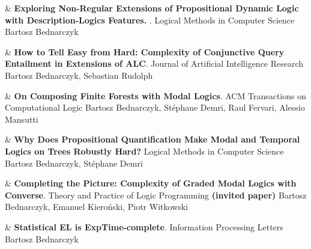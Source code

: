 \documentclass[10pt,a4paper]{article}
\begin{document}
\begin{EntriesTableYear}
    &
    \textbf{Exploring Non-Regular Extensions of Propositional Dynamic Logic with Description-Logics Features.
    }.
    \newline
    Logical Methods in Computer Science 
    \newline
    Bartosz Bednarczyk
    \\
  \end{EntriesTableYear}

\begin{EntriesTableYear}
  &
  \textbf{How to Tell Easy from Hard: Complexity of Conjunctive Query Entailment in Extensions of ALC}.
  \newline
  Journal of Artificial Intelligence Research 
  \newline
  Bartosz Bednarczyk, Sebastian Rudolph
  \\
\end{EntriesTableYear}

\begin{EntriesTableYear}
  &
  \textbf{On Composing Finite Forests with Modal Logics}.
  \newline
  ACM Transactions on Computational Logic
  \newline
  Bartosz Bednarczyk, Stéphane Demri, Raul Fervari, Alessio Mansutti
  \\
\end{EntriesTableYear}

\begin{EntriesTableYear}
  &
  \textbf{Why Does Propositional Quantification Make Modal and Temporal Logics on Trees Robustly Hard?}
  \newline
  Logical Methods in Computer Science
  \newline
 Bartosz Bednarczyk, Stéphane Demri
  \\
\end{EntriesTableYear}

\begin{EntriesTableYear}
  &
  \textbf{Completing the Picture: Complexity of Graded Modal Logics with Converse}.
  \newline
  Theory and Practice of Logic Programming \textbf{(invited paper)}
  \newline
 Bartosz Bednarczyk, Emanuel Kieroński, Piotr Witkowski
  \\
\end{EntriesTableYear}

\begin{EntriesTableYear}
  &
  \textbf{Statistical EL is ExpTime-complete}.
  \newline
  Information Processing Letters
  \newline
 Bartosz Bednarczyk
  \\
\end{EntriesTableYear}
\end{document}

